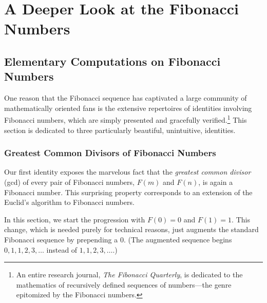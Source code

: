 
\chapter{A Deeper Look at the Fibonacci Numbers}
\label{ch:FIBO-enrich}

\noindent {}


\section{Elementary Computations on Fibonacci Numbers}
\label{sec:FIBO-enrich-ops}


One reason that the Fibonacci sequence has captivated a large community of mathematically oriented fans is the extensive repertoires of identities involving Fibonacci numbers, which are simply presented and gracefully verified.\footnote{An entire research journal, {\it The Fibonacci Quarterly}, is dedicated to the mathematics of recursively defined sequences of numbers---the genre epitomized by the Fibonacci numbers.}  This section is dedicated to three particularly beautiful,  unintuitive, identities.

\subsection{Greatest Common Divisors of Fibonacci Numbers}
\label{Appendix:FiboGCD}

Our first identity exposes the marvelous fact that the {\em greatest common divisor} ({\sc gcd}) of every pair of Fibonacci numbers, $F(m)$ and $F(n)$, is again a Fibonacci number.  This surprising property corresponds to an extension of the Euclid's algorithm to Fibonacci numbers.

\smallskip

In this section, we start the progression with $F(0) = 0$ and $F(1) = 1$.  This change, which is needed purely for technical reasons, just augments the standard Fibonacci sequence by prepending a $0$.  (The augmented sequence begins $0,1,1,2,3, \ldots$ instead of $1,1,2,3, \ldots$.)

